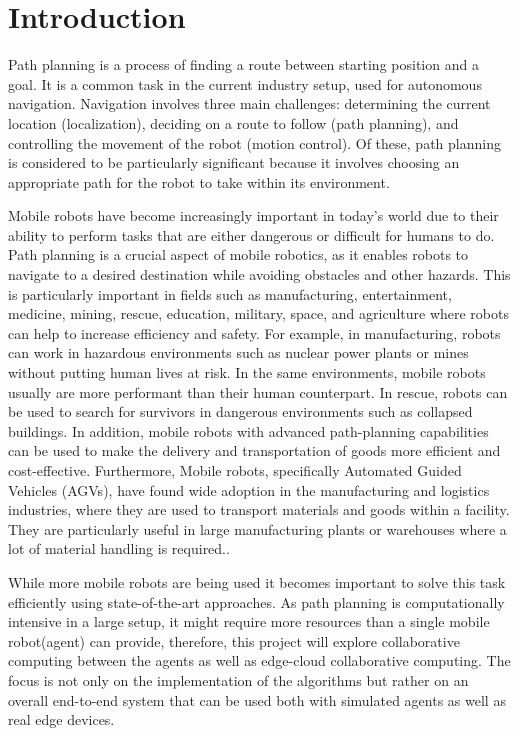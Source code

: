 \chapter{Introduction}

Path planning is a process of finding a route between starting position and a goal. It is a common task in the current industry setup, used for autonomous navigation. Navigation involves three main challenges: determining the current location (localization), deciding on a route to follow (path planning), and controlling the movement of the robot (motion control). Of these, path planning is considered to be particularly significant because it involves choosing an appropriate path for the robot to take within its environment\cite{path_lanning_intro}. 

Mobile robots have become increasingly important in today's world due to their ability to perform tasks that are either dangerous or difficult for humans to do. Path planning is a crucial aspect of mobile robotics, as it enables robots to navigate to a desired destination while avoiding obstacles and other hazards. This is particularly important in fields such as manufacturing, entertainment, medicine, mining, rescue, education, military, space, and agriculture where robots can help to increase efficiency and safety. For example, in manufacturing, robots can work in hazardous environments such as nuclear power plants or mines without putting human lives at risk. In the same environments, mobile robots usually are more performant than their human counterpart. In rescue, robots can be used to search for survivors in dangerous environments such as collapsed buildings. In addition, mobile robots with advanced path-planning capabilities can be used to make the delivery and transportation of goods more efficient and cost-effective. Furthermore, Mobile robots, specifically Automated Guided Vehicles (AGVs), have found wide adoption in the manufacturing and logistics industries, where they are used to transport materials and goods within a facility. They are particularly useful in large manufacturing plants or warehouses where a lot of material handling is required.\cite{intro_mobile_robots}. 

While more mobile robots are being used it becomes important to solve this task efficiently using state-of-the-art approaches. As path planning is computationally intensive in a large setup, it might require more resources than a single mobile robot(agent) can provide, therefore, this project will explore collaborative computing between the agents as well as edge-cloud collaborative computing. The focus is not only on the implementation of the algorithms but rather on an overall end-to-end system that can be used both with simulated agents as well as real edge devices.

